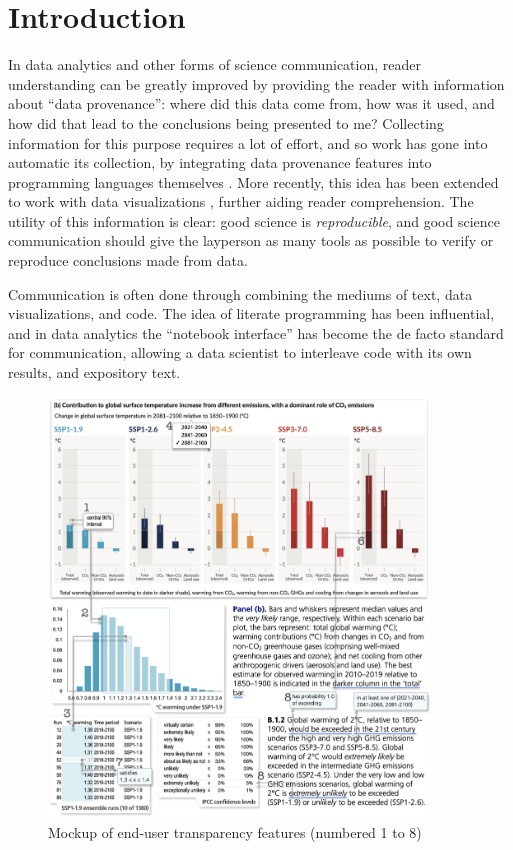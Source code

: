 \section{Introduction}

In data analytics and other forms of science communication, reader understanding can be greatly improved by
providing the reader with information about ``data provenance'': where did this data come from, how was it
used, and how did that lead to the conclusions being presented to me? Collecting information for this purpose
requires a lot of effort, and so work has gone into automatic its collection, by integrating data provenance
features into programming languages themselves \cite{fehrenbach16}. More recently, this idea has been extended
to work with data visualizations \cite{perera22,bond24}, further aiding reader comprehension. The utility of this
information is clear: good science  is \emph{reproducible}, and good science communication should give the
layperson as many tools as possible to verify or reproduce conclusions made from data.

Communication is often done through combining the mediums of text, data visualizations, and code. The idea of
literate programming \cite{knuth84} has been influential, and in data analytics the ``notebook interface''
\cite{kluyver16} has become the de facto standard for communication, allowing a data scientist to interleave
code with its own results, and expository text.

\begin{figure}[h]
   \includegraphics[width=0.9\textwidth]{fig/ipcc-mockup.png}
   \caption{Mockup of end-user transparency features (numbered 1 to 8)}
   \label{fig:ipcc-mockup}
\end{figure}


